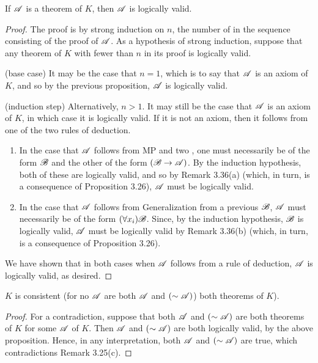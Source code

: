 \begin{proposition}
  If \(\mathscr{A}\) is a theorem of \(K\), then \(\mathscr{A}\) is logically valid.

  \begin{proof}
    The proof is by strong induction on \(n\), the number of \wfs{} in the sequence consisting of the proof of \(\mathscr{A}\). As a hypothesis of strong induction, suppose that any theorem of \(K\) with fewer than \(n\) \wfs{} in its proof is logically valid.

    (base case) It may be the case that \(n = 1\), which is to say that \(\mathscr{A}\) is an axiom of \(K\), and so by the previous proposition, \(\mathscr{A}\) is logically valid. 

    (induction step) Alternatively, \(n > 1\). It may still be the case that \(\mathscr{A}\) is an axiom of \(K\), in which case it is logically valid. If it is not an axiom, then it follows from one of the two rules of deduction.
    \begin{enumerate}
      \item In the case that \(\mathscr{A}\) follows from MP and two \wfs{}, one \wf{} must necessarily be of the form \(\mathscr{B}\) and the other of the form \((\mathscr{B} \rightarrow \mathscr{A})\). By the induction hypothesis, both of these \wfs{} are logically valid, and so by Remark 3.36(a) (which, in turn, is a consequence of Proposition 3.26), \(\mathscr{A}\) must be logically valid.

      \item In the case that \(\mathscr{A}\) follows from Generalization from a previous \wf{} \(\mathscr{B}\), \(\mathscr{A}\) must necessarily be of the form \((\forall x_i) \mathscr{B}\). Since, by the induction hypothesis, \(\mathscr{B}\) is logically valid, \(\mathscr{A}\) must be logically valid by Remark 3.36(b) (which, in turn, is a consequence of Proposition 3.26).
    \end{enumerate}

    We have shown that in both cases when \(\mathscr{A}\) follows from a rule of deduction, \(\mathscr{A}\) is logically valid, as desired.
  \end{proof}
\end{proposition}

\begin{corollary}
  \(K\) is consistent (for no \wf{} \(\mathscr{A}\) are both \(\mathscr{A}\) and \((\sim\mathscr{A})\)) both theorems of \(K\)).

  \begin{proof}
    For a contradiction, suppose that both \(\mathscr{A}\) and \((\sim\mathscr{A})\) are both theorems of \(K\) for some \wf{} \(\mathscr{A}\) of \(K\). Then \(\mathscr{A}\) and \((\sim\mathscr{A})\) are both logically valid, by the above proposition. Hence, in any interpretation, both \(\mathscr{A}\) and \((\sim\mathscr{A})\) are true, which contradictions Remark 3.25(c).
  \end{proof}
\end{corollary}


